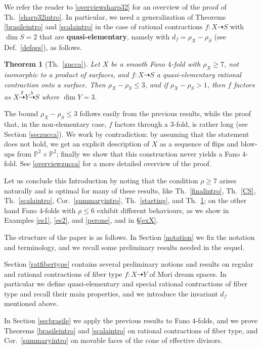 \documentclass[a4paper,12pt]{amsart}
\newtheorem{thm}{Theorem}[section]
\theoremstyle{definition}
\numberwithin{figure}{section}
\numberwithin{table}{section}
\newcommand{\pr}{\mathbb{P}}
\begin{document}
We refer the reader to \ref{overviewsharp32} for an overview of the proof of Th.~\ref{sharp32intro}.
 In particular,  we need  a generalization of Theorems \ref{brasileintro} and \ref{scalaintro} in the case of
rational contractions $f\colon X\dasharrow S$ with $\dim S=2$ that are {\bf quasi-elementary}, namely with $d_f=\rho_X-\rho_S$ (see Def.~\ref{defqes}), as follows.
\begin{thm}[Th.~\ref{zucca}]\label{zuccaintro}
  Let $X$ be a smooth Fano $4$-fold with $\rho_X\geq 7$, not isomorphic to a product of surfaces, and  $f\colon X\dasharrow S$ a quasi-elementary rational contraction onto a surface.   Then $\rho_X-\rho_S\leq 3$,
  and if $\rho_X-\rho_S>1$, then $f$ factors as $X\stackrel{g}{\dasharrow}Y\stackrel{h}{\dasharrow} S$ where $\dim Y=3$. 
\end{thm}
The bound $\rho_X-\rho_S\leq 3$ follows easily from the previous results, while the proof that, in the non-elementary case, $f$ factors through a $3$-fold,
 is rather long (see Section \ref{seczucca}). 
We work by contradiction: by assuming that the statement does not hold, we get an explicit description of $X$ as a sequence of flips and blow-ups from $\pr^2\times\pr^2$; finally we show that this construction never yields a Fano $4$-fold. See \ref{overviewzucca} for a more detailed overview of the proof.

\medskip

Let us conclude this Introduction by noting that the condition $\rho\geq 7$ arises naturally and is optimal for many of these results, like Th.~\ref{finalintro}, Th.~\ref{CS}, Th.~\ref{scalaintro}, Cor.~\ref{summaryintro},   Th.~\ref{starting}, and Th.~\ref{zuccaintro}; on the other hand
Fano $4$-folds with $\rho\leq 6$ exhibit different behaviours,
as we show in Examples \ref{es1}, \ref{es2}, and \ref{perone}, and in \S\ref{exX}.

\medskip

The structure of the paper is as follows.
In Section \ref{notation} we fix the notation and terminology, and we recall some preliminary results needed in the sequel.

Section \ref{ratfibertype} contains several preliminary notions and results on regular and rational contractions of fiber type $f\colon X\dasharrow Y$ of Mori dream spaces. In particular we define quasi-elementary and special rational contractions of fiber type and recall their main properties, and we introduce
the invariant $d_f$ mentioned above.

In Section \ref{secbrasile} we apply the previous results to Fano $4$-folds, and we prove Theorems \ref{brasileintro} and \ref{scalaintro} on rational contractions of fiber type, and Cor.~\ref{summaryintro} on movable faces of the cone of effective divisors.
\end{document}
